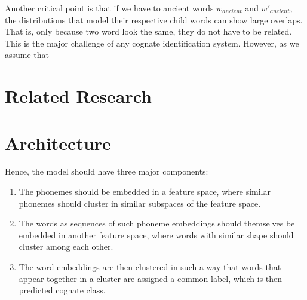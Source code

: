 \documentclass[8pt]{article}
\begin{document}
% 
%
%

Another critical point is that if we have to ancient words $w_{ancient}$ and $w'_{ancient}$, the distributions that model their respective  child words can show large overlaps. That is, only because two word look the same, they do not have to be related. This is the major challenge of any cognate identification system. However, as we assume that 


\section{Related Research}
\section{Architecture}
Hence, the model should have three major components:
\begin{enumerate}
\item The phonemes should be embedded in a feature space, where similar phonemes should cluster in similar subspaces of the feature space. 
\item The words as sequences of such phoneme embeddings should themselves be embedded in another feature space, where words with similar shape should cluster among each other. 
\item The word embeddings are then clustered in such a way that words that appear together in a cluster are assigned a common label, which is then predicted cognate class.
\end{enumerate}
\end{document}
